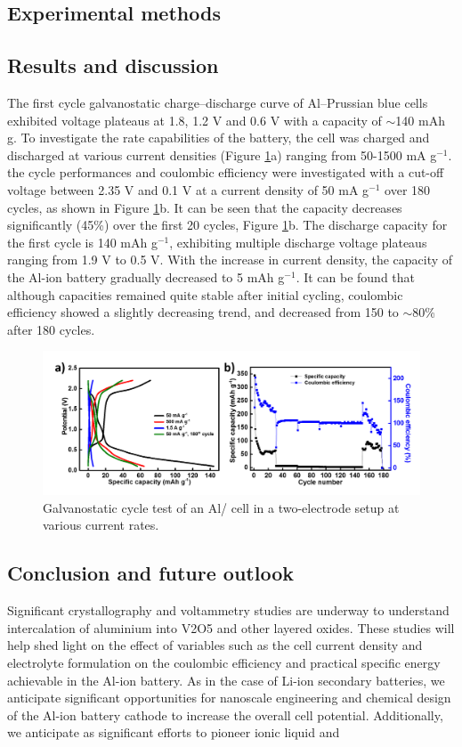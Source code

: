 \subsection{Experimental methods}
\subsection{Results and discussion}
The first cycle galvanostatic charge–discharge curve of Al–Prussian blue cells exhibited voltage plateaus at 1.8, 1.2 V and 0.6 V with a capacity of $\sim$140 mAh g. To investigate the rate capabilities of the battery, the cell was charged and discharged at various current densities (Figure \ref{Figures/chap6fig:pbCDC2}a) ranging from 50-1500 mA g$^{-1}$. the cycle performances and coulombic efficiency were investigated with a cut-off voltage between 2.35 V and 0.1 V at a current density of 50 mA g$^{-1}$ over 180 cycles, as shown in Figure \ref{Figures/chap6fig:pbCDC2}b. It can be seen that the capacity decreases significantly (45\%) over the first 20 cycles, Figure \ref{Figures/chap6fig:pbCDC2}b. The discharge capacity for the first cycle is 140 mAh g$^{-1}$, exhibiting multiple discharge voltage plateaus ranging from 1.9 V to 0.5 V. With the increase in current density, the capacity of the Al-ion battery gradually decreased to 5 mAh g$^{-1}$. It can be found that although capacities remained quite stable after initial cycling, coulombic efficiency showed a slightly decreasing trend, and decreased from 150 to $\sim$80\% after 180 cycles. 

 \begin{figure}[tbh!]
  \centering
  \includegraphics[width=\textwidth]{Figures/chap6fig/pbCDC2}
    \caption{Galvanostatic cycle test of an Al/ cell in a two-electrode setup at various current rates.}
  \label{Figures/chap6fig:pbCDC2}
\end{figure}

\subsection{Conclusion and future outlook}
Significant crystallography and voltammetry studies are underway to understand intercalation of aluminium into V2O5 and other layered oxides. These studies will help
shed light on the effect of variables such as the cell current
density and electrolyte formulation on the coulombic efficiency
and practical specific energy achievable in the Al-ion battery. As in the case of Li-ion secondary batteries, we anticipate significant opportunities for nanoscale engineering and chemical design of the Al-ion battery cathode to increase the overall cell potential. Additionally, we anticipate as significant efforts to pioneer ionic liquid and
